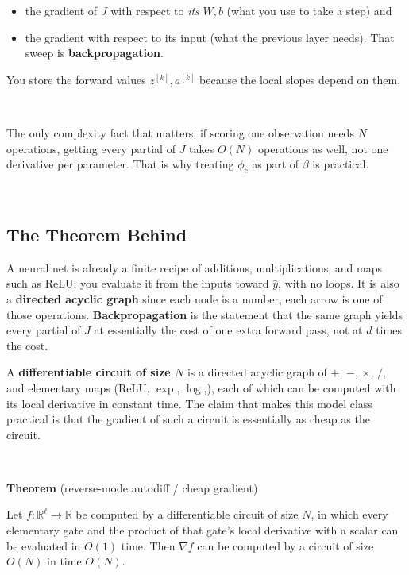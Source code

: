 \documentclass[
]{book}
\begin{document}
\begin{itemize}
\item
  the gradient of \(J\) with respect to \emph{its} \(W,b\) (what you use to take a step) and
\item
  the gradient with respect to its input (what the previous layer needs). That sweep is \textbf{backpropagation}.
\end{itemize}

You store the forward values \(z^{[k]},a^{[k]}\) because the local slopes depend on them.

~

The only complexity fact that matters: if scoring one observation needs \(N\) operations, getting every partial of \(J\) takes \(O(N)\) operations as well, not one derivative per parameter. That is why treating \(\phi_c\) as part of \(\beta\) is practical.

~

\subsection{The Theorem Behind}\label{the-theorem-behind}

A neural net is already a finite recipe of additions, multiplications, and maps such as ReLU: you evaluate it from the inputs toward \(\hat y\), with no loops. It is also a \textbf{directed acyclic graph} since each node is a number, each arrow is one of those operations. \textbf{Backpropagation} is the statement that the same graph yields every partial of \(J\) at essentially the cost of one extra forward pass, not at \(d\) times the cost.

A \textbf{differentiable circuit of size \(N\)} is a directed acyclic graph of \(+\), \(-\), \(\times\), \(/\), and elementary maps (\(\mathrm{ReLU}\), \(\exp\), \(\log\),), each of which can be computed with its local derivative in constant time. The claim that makes this model class practical is that the gradient of such a circuit is essentially as cheap as the circuit.

~

\textbf{Theorem} (reverse-mode autodiff / cheap gradient)

Let \(f:\mathbb{R}^\ell\to\mathbb{R}\) be computed by a differentiable circuit of size \(N\), in which every elementary gate and the product of that gate's local derivative with a scalar can be evaluated in \(O(1)\) time. Then \(\nabla f\) can be computed by a circuit of size \(O(N)\) in time \(O(N)\).
\end{document}

